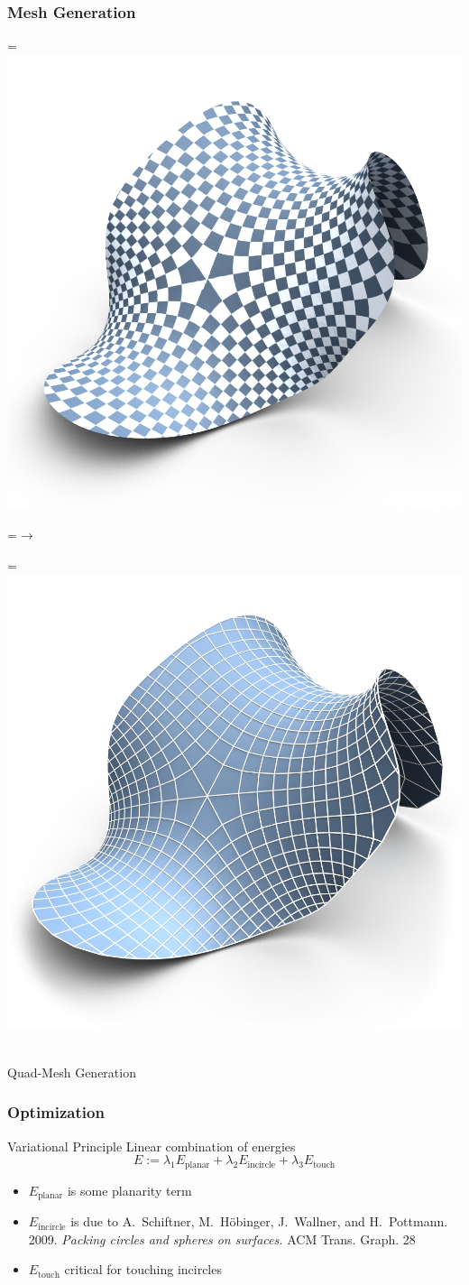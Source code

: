 \documentclass[12pt]{beamer}
\newcommand*{\vcenteredhbox}[1]{\begingroup
\setbox0=\hbox{#1}\parbox{\wd0}{\box0}\endgroup}
\begin{document}
\begin{frame}
  \frametitle{Mesh Generation}
	\begin{center}
	\vcenteredhbox{\includegraphics[width=0.47\linewidth]{cover02_no_vectors.png}}
	\vcenteredhbox{$\rightarrow$}
	\vcenteredhbox{\includegraphics[width=0.47\linewidth]{cover03_no_directions.png}}\\
	Quad-Mesh Generation
	\end{center}
\end{frame}

\begin{frame}
	\frametitle{Optimization}
	\begin{block}{Variational Principle}
		Linear combination of energies
        	\begin{equation*}
		  E := 
		  \lambda_1 E_{\mathrm{planar}} + 
		  \lambda_2 E_{\mathrm{incircle}} + 
		  \lambda_3 E_{\mathrm{touch}}
		\end{equation*}
	\end{block}
\begin{itemize}
\item $E_{\mathrm{planar}}$ is some planarity term
\item $E_{\mathrm{incircle}}$ is due to 
	A.~Schiftner, M.~H\"obinger, J.~Wallner, and H.~Pottmann. 2009. \emph{Packing circles and spheres on surfaces.} ACM Trans. Graph. 28
\item $E_{\mathrm{touch}}$ critical for touching incircles
\end{itemize}
\end{frame}
\end{document}
